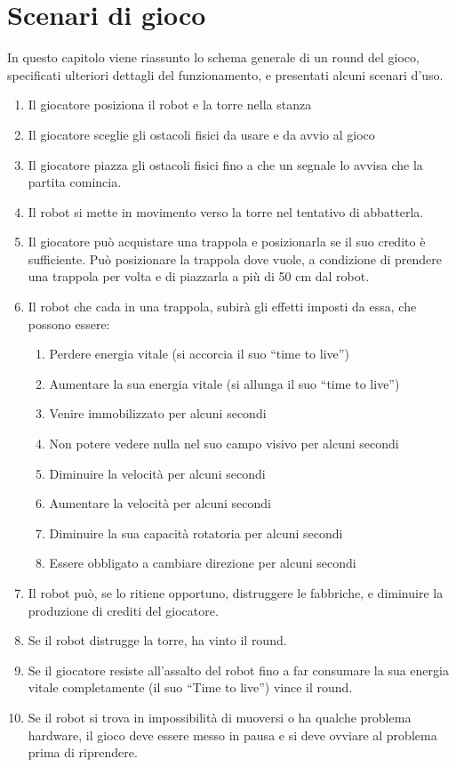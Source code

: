 \chapter{Scenari di gioco}
\label{cap:scenari}

In questo capitolo viene riassunto lo schema generale di un round del gioco, specificati ulteriori dettagli del funzionamento, e presentati alcuni scenari d'uso.

\begin{enumerate}
    \item Il giocatore posiziona il robot e la torre nella stanza
	\item Il giocatore sceglie gli ostacoli fisici da usare e da avvio al gioco
	\item Il giocatore piazza gli ostacoli fisici fino a che un segnale lo avvisa che la partita comincia.
	\item Il robot si mette in movimento verso la torre nel tentativo di abbatterla.
	\item Il giocatore può acquistare una trappola e posizionarla se il suo credito è sufficiente. Può posizionare la trappola dove vuole, a condizione di prendere una trappola per volta e di piazzarla a più di 50 cm dal robot.
	\item Il robot che cada in una trappola, subirà gli effetti imposti da essa, che possono essere:
		\begin{enumerate}
		\item Perdere energia vitale (si accorcia il suo “time to live”)
		\item Aumentare la sua energia vitale (si allunga il suo “time to live”)
		\item Venire immobilizzato per alcuni secondi
		\item Non potere vedere nulla nel suo campo visivo per alcuni secondi
		\item Diminuire la velocità per alcuni secondi
		\item Aumentare la velocità per alcuni secondi
		\item Diminuire la sua capacità rotatoria per alcuni secondi
		\item Essere obbligato a cambiare direzione per alcuni secondi
		\end{enumerate}
	\item Il robot può, se lo ritiene opportuno, distruggere le fabbriche, e diminuire la produzione di crediti del giocatore.
	\item Se il robot distrugge la torre, ha vinto il round.
	\item Se il giocatore resiste all’assalto del robot fino a far consumare la sua energia vitale completamente (il suo “Time to live”) vince il round.
	\item Se il robot si trova in impossibilità di muoversi o ha qualche problema hardware, il gioco deve essere messo in pausa e si deve ovviare al problema prima di riprendere.
	\end{enumerate}

